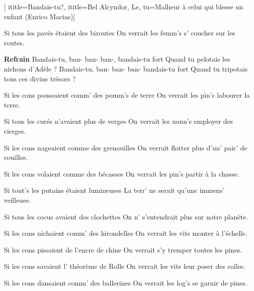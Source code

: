 [
  ititle={Bandais-tu?},
  ititle={Bel Alcyndor, Le},
  tu={Malheur à celui qui blesse un enfant (Enrico Macias)}]

  
\beginverse
Si tous les pavés étaient des biroutes
On verrait les femm's s' coucher sur les routes.
\endverse

\beginchorus
\textbf{Refrain}
Bandais-tu, ban- ban- ban-, bandais-tu fort
Quand tu pelotais les nichons d'Adèle ?
Bandais-tu, ban- ban- ban- bandais-tu fort
Quand tu tripotais tous ces divins trésors ?
\endchorus

\beginverse
Si les cons poussaient comm' des pomm's de terre
On verrait les pin's labourer la terre.
\endverse

\beginverse
Si tous les curés n'avaient plus de verges
On verrait les nonn's employer des cierges.
\endverse

\beginverse
Si les cons nageaient comme des grenouilles
On verrait flotter plus d'un' pair' de couilles.
\endverse

\beginverse
Si les cons volaient comme des bécasses
On verrait les pin's partir à la chasse.
\endverse

\beginverse
Si tout's les putains étaient lumineuses
La terr' ne serait qu'une immens' veilleuse.
\endverse

\beginverse
Si tous les cocus avaient des clochettes
On n' s'entendrait plus sur notre planète.
\endverse

\beginverse
Si les cons nichaient comm' des hirondelles
On verrait les vits monter à l'échelle.
\endverse

\beginverse
Si les cons pissaient de l'encre de chine
On verrait s'y tremper toutes les pines.
\endverse

\beginverse
Si les cons savaient l' théorème de Rolle
On verrait les vits leur poser des colles.
\endverse

\beginverse
Si les cons dansaient comm' des ballerines
On verrait les log's se garnir de pines.
\endverse

\endsong
